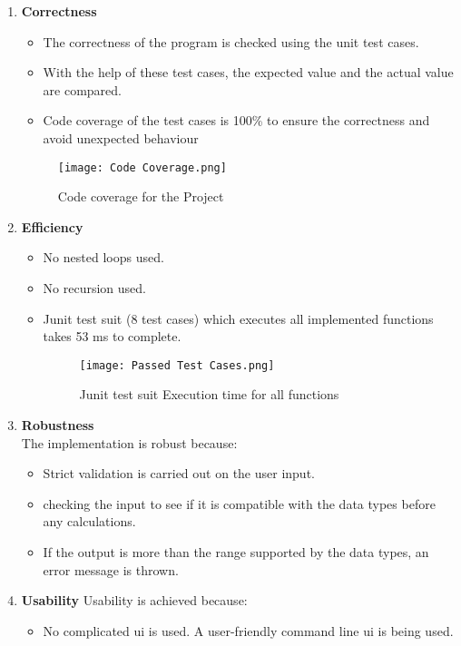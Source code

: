 \documentclass{article}
\begin{document}
\begin{enumerate}
\item \textbf{Correctness}
\begin{itemize}
\item The correctness of the program is checked using the unit test cases.\cite{10}
\item With the help of these test cases, the expected value and the actual value are compared.
\item Code coverage of the test cases is 100\% to ensure the correctness and avoid unexpected behaviour
\end{itemize}
 \begin{figure}[htp]
    \centering
    \texttt{[image: Code Coverage.png]}
    \caption{Code coverage for the Project}
    \label{Code coverage for the Project}
\end{figure}
\item \textbf{Efficiency}
\begin{itemize}
    \item No nested loops used.
    \item No recursion  used.
    \item Junit test suit (8 test cases) which executes all implemented functions takes  53 ms to complete.
     \begin{figure}[htp]
    \centering
    \texttt{[image: Passed Test Cases.png]}
    \caption{ Junit test suit Execution time for all functions}
    \label{Execution time for all functions}
\end{figure}
\end{itemize}\newpage
\item \textbf{Robustness}\\
The implementation is robust because:
\begin{itemize}
\item Strict validation is carried out on the user input.
\item checking the input to see if it is compatible with the data types before any calculations. 
\item If the output is more than the range supported by the data types, an error message is thrown.
\end{itemize}
\item \textbf{Usability}
\newline Usability is achieved because:
\begin{itemize}
\item No complicated ui is used. A user-friendly command line ui is being used.

\end{itemize}
\end{enumerate}
\end{document}
